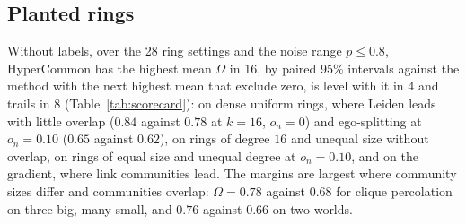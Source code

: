 \subsection{Planted rings}
\label{sec:planted}

Without labels, over the 28 ring settings and the noise range $p\le0.8$, HyperCommon has
the highest mean $\Omega$ in 16, by paired 95\% intervals against the method with the next highest mean that exclude zero, is level with it in 4 and trails in 8 (Table~\ref{tab:scorecard}): on dense
uniform rings, where Leiden leads with little overlap ($0.84$ against $0.78$ at $k=16$,
$o_n=0$) and ego-splitting at $o_n=0.10$ ($0.65$ against $0.62$), on rings of degree $16$ and
unequal size without overlap, on rings of equal size and unequal degree at $o_n=0.10$,
and on the gradient, where link communities lead. The margins are largest where community sizes differ and
communities overlap: $\Omega=0.78$ against $0.68$ for clique percolation on three big,
many small, and $0.76$ against $0.66$ on two worlds.

